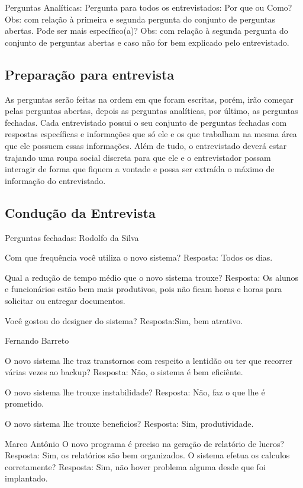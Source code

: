 Perguntas Analíticas:
Pergunta para todos os entrevistados:
Por que ou Como?
Obs: com relação à primeira e segunda pergunta do conjunto de perguntas abertas.
Pode ser mais específico(a)?
Obs: com relação à segunda pergunta do conjunto de perguntas abertas e caso não for bem explicado pelo entrevistado.

\subsection{Preparação para entrevista}
As perguntas serão feitas na ordem em que foram escritas, porém, irão começar pelas perguntas abertas, 
depois as perguntas analíticas, por último, as perguntas fechadas. 
Cada entrevistado possui o seu conjunto de perguntas fechadas com respostas específicas e informações
que só ele e os que trabalham na mesma área que ele possuem essas informações. 
Além de tudo, o entrevistado deverá estar trajando uma roupa social discreta para que ele e o entrevistador
possam interagir de forma que fiquem a vontade e possa ser extraída o máximo de informação do entrevistado.

\subsection{Condução da Entrevista}
 Perguntas fechadas:
Rodolfo da Silva

Com que frequência você utiliza o novo sistema?
Resposta: Todos os dias.

Qual a redução de tempo médio que  o novo sistema trouxe?
Resposta: Os alunos e funcionários estão bem mais produtivos, pois não ficam horas e horas para solicitar ou entregar documentos.

Você gostou do designer do sistema?
Resposta:Sim, bem atrativo.

Fernando Barreto

O novo sistema lhe traz transtornos com respeito a lentidão ou ter que recorrer várias vezes ao backup?
Resposta: Não, o sistema é bem eficiênte.

O novo sistema lhe trouxe instabilidade?
Resposta: Não, faz o que lhe é prometido.

O novo sistema lhe trouxe beneficios?
Resposta: Sim, produtividade.

Marco Antônio
O novo programa é preciso na geração de relatório de lucros?
Resposta: Sim, os relatórios são bem organizados.
O sistema efetua os calculos corretamente?
Resposta: Sim, não hover problema alguma desde que foi implantado.

